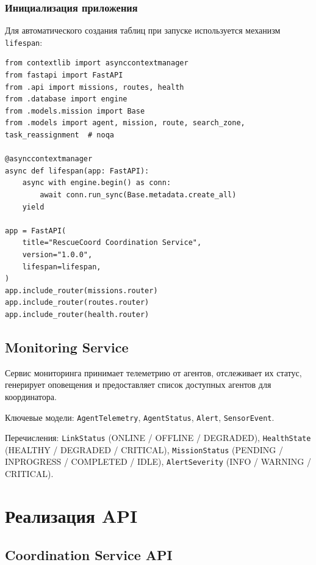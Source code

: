 \documentclass[12pt,a4paper]{article}
\begin{document}
\subsubsection{Инициализация приложения}

Для автоматического создания таблиц при запуске используется механизм
\texttt{lifespan}:

\begin{lstlisting}[caption={Точка входа coordination\_service/app/main.py}]
from contextlib import asynccontextmanager
from fastapi import FastAPI
from .api import missions, routes, health
from .database import engine
from .models.mission import Base
from .models import agent, mission, route, search_zone, task_reassignment  # noqa

@asynccontextmanager
async def lifespan(app: FastAPI):
    async with engine.begin() as conn:
        await conn.run_sync(Base.metadata.create_all)
    yield

app = FastAPI(
    title="RescueCoord Coordination Service",
    version="1.0.0",
    lifespan=lifespan,
)
app.include_router(missions.router)
app.include_router(routes.router)
app.include_router(health.router)
\end{lstlisting}

\subsection{Monitoring Service}

Сервис мониторинга принимает телеметрию от агентов, отслеживает их статус,
генерирует оповещения и предоставляет список доступных агентов для координатора.

Ключевые модели: \texttt{AgentTelemetry}, \texttt{AgentStatus}, \texttt{Alert},
\texttt{SensorEvent}.

Перечисления: \texttt{LinkStatus} (ONLINE / OFFLINE / DEGRADED),
\texttt{HealthState} (HEALTHY / DEGRADED / CRITICAL),
\texttt{MissionStatus} (PENDING / IN\textunderscore PROGRESS / COMPLETED / IDLE),
\texttt{AlertSeverity} (INFO / WARNING / CRITICAL).

\section{Реализация API}

\subsection{Coordination Service API}
\end{document}
